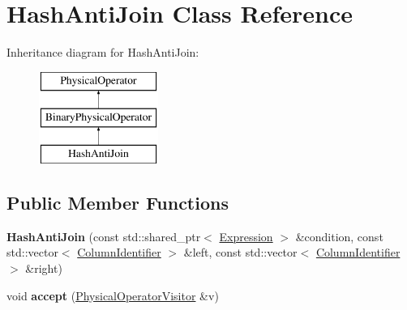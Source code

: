 \hypertarget{class_hash_anti_join}{\section{Hash\+Anti\+Join Class Reference}
\label{class_hash_anti_join}
}
Inheritance diagram for Hash\+Anti\+Join\+:\begin{figure}[H]
\begin{center}
\leavevmode
\includegraphics[height=3.000000cm]{class_hash_anti_join}
\end{center}
\end{figure}
\subsection*{Public Member Functions}
\begin{DoxyCompactItemize}
\item 
\hypertarget{class_hash_anti_join_adf6f72c234cc4a3e09e1eab671255912}{{\bfseries Hash\+Anti\+Join} (const std\+::shared\+\_\+ptr$<$ \hyperlink{class_expression}{Expression} $>$ \&condition, const std\+::vector$<$ \hyperlink{class_column_identifier}{Column\+Identifier} $>$ \&left, const std\+::vector$<$ \hyperlink{class_column_identifier}{Column\+Identifier} $>$ \&right)}\label{class_hash_anti_join_adf6f72c234cc4a3e09e1eab671255912}

\item 
\hypertarget{class_hash_anti_join_a8a629e5592d9a42ce155dd83f7f551d0}{void {\bfseries accept} (\hyperlink{class_physical_operator_visitor}{Physical\+Operator\+Visitor} \&v)}\label{class_hash_anti_join_a8a629e5592d9a42ce155dd83f7f551d0}

\end{DoxyCompactItemize}
